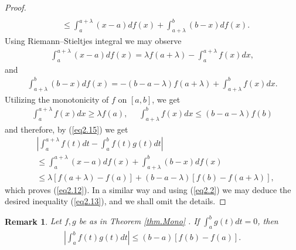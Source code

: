 \documentclass{amsart}
\theoremstyle{plain}
\newtheorem{remark}{Remark}
\numberwithin{equation}{section}
\begin{document}
\begin{proof}
\begin{align}
\nonumber\\
&\le \int_a^{a + \lambda } {\left( { x-a} \right) df\left( x
\right)}+\int_{a + \lambda }^b { \left( {b-x} \right) df\left( x
\right)} . \label{eq2.15}
\end{align}
Using Riemann--Stieltjes integral we may observe
\begin{align*}
\int_a^{a + \lambda } {\left( { x-a} \right) df\left( x \right)} =
\lambda f\left( {a + \lambda} \right)  - \int_a^{a + \lambda }
{f\left( x \right)dx},
\end{align*}
and
\begin{align*}
\int_{a + \lambda }^b { \left( {b-x} \right) df\left( x \right)} =
- \left( {b-a - \lambda} \right) f\left( a + \lambda \right) +
\int_{a + \lambda }^b { f\left( x \right)dx}.
\end{align*}
Utilizing the monotonicity of $f$ on $[a,b]$, we get
\begin{align*}
\int_a^{a + \lambda } {f\left( x \right)dx} \ge  \lambda f\left( a
\right),\,\,\,\,\,\,\,\,\int_{a + \lambda }^b { f\left( x
\right)dx} \le \left( {b - a - \lambda} \right)f\left( b \right)
\end{align*}
and therefore, by (\ref{eq2.15}) we get
\begin{align*}
&\left| {\int_a^{a + \lambda } {f\left( t \right)dt}  - \int_a^b
{f\left( t \right)g\left( t \right)dt} } \right|
\\
&\le \int_a^{a + \lambda } {\left( { x-a} \right) df\left( x
\right)}+\int_{a + \lambda }^b { \left( {b-x} \right) df\left( x
\right)}
\\
&\le  \lambda \left[ {f\left( {a + \lambda } \right) - f\left( a
\right)} \right] + \left( {b - a - \lambda } \right)\left[
{f\left( b \right) - f\left( {a + \lambda } \right)} \right],
\end{align*}
which proves (\ref{eq2.12}). In a similar way and using
(\ref{eq2.2}) we may deduce the desired inequality (\ref{eq2.13}),
and we shall omit the details.
\end{proof}

\begin{remark}
Let $f,g$ be as in Theorem \ref{thm.Mono} . If $\int_a^b {g\left(
t \right)dt} =0 $, then
\begin{align}
\left| { \int_a^b {f\left( t \right)g\left( t \right)dt} } \right|
\le \left( {b - a} \right)\left[ {f\left( b \right) - f\left( {a }
\right)} \right].
\end{align}
\end{remark}
\end{document}
